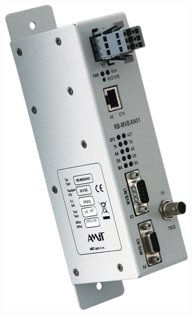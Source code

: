 \begin{minipage}{0.4\textwidth}
  \includegraphics[width=0.7\linewidth]{Figures/Chap3/Konkurenz/Amit.png}
  \label{fig:AmitAnalyzer}
\end{minipage}
\hfill

